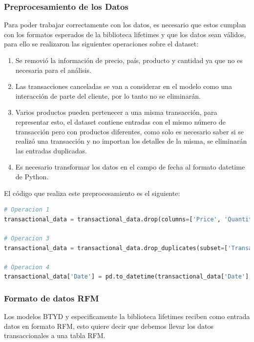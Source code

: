 \subsubsection{Preprocesamiento de los Datos}

Para poder trabajar correctamente con los datos, es necesario que estos cumplan con los formatos esperados de la biblioteca lifetimes y que los datos sean válidos, para ello se realizaron las siguientes operaciones sobre el dataset:

\begin{enumerate}
	\item Se removió la información de precio, país, producto y cantidad ya que no es necesaria para el análisis.
	\item Las transacciones canceladas se van a considerar en el modelo como una interacción de parte del cliente, por lo tanto no se eliminarán.
	\item Varios productos pueden pertenecer a una misma transacción, para representar esto, el dataset contiene entradas con el mismo número de transacción pero con productos diferentes, como solo es necesario saber si se realizó una transacción y no importan los detalles de la misma, se eliminarán las entradas duplicadas.
	\item Es necesario transformar los datos en el campo de fecha al formato datetime de Python.
\end{enumerate}

El código que realiza este preprocesamiento es el siguiente:

\begin{lstlisting}[language=Python, caption=Preprocesamiento en modelo.ipynb]
# Operacion 1
transactional_data = transactional_data.drop(columns=['Price', 'Quantity', 'Country', 'ProductName', 'ProductNo'])

# Operacion 3
transactional_data = transactional_data.drop_duplicates(subset=['TransactionNo'])

# Operacion 4
transactional_data['Date'] = pd.to_datetime(transactional_data['Date'], format='%m/%d/%Y')
\end{lstlisting}

\subsubsection{Formato de datos RFM}

Los modelos BTYD y especificamente la biblioteca lifetimes reciben como entrada datos en formato RFM, esto quiere decir que debemos llevar los datos transaccionales a una tabla RFM.

